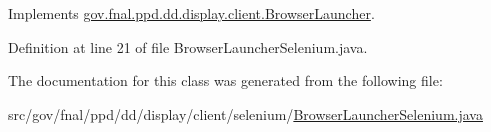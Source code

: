 Implements \hyperlink{classgov_1_1fnal_1_1ppd_1_1dd_1_1display_1_1client_1_1BrowserLauncher_a09da69929d79dc20075d5be2572f361c}{gov.\-fnal.\-ppd.\-dd.\-display.\-client.\-Browser\-Launcher}.



Definition at line 21 of file Browser\-Launcher\-Selenium.\-java.



The documentation for this class was generated from the following file\-:\begin{DoxyCompactItemize}
\item 
src/gov/fnal/ppd/dd/display/client/selenium/\hyperlink{BrowserLauncherSelenium_8java}{Browser\-Launcher\-Selenium.\-java}\end{DoxyCompactItemize}
